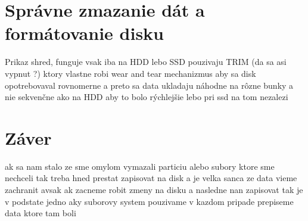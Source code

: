 \documentclass[12pt,oneside,slovak,a4paper]{article}
\begin{document}
\section{Správne zmazanie dát a formátovanie disku}
Prikaz shred, funguje vsak iba na HDD lebo SSD pouzivaju TRIM (da sa asi vypnut ?) ktory vlastne robi wear and tear mechanizmus aby sa disk opotrebovaval rovnomerne a preto sa data ukladaju náhodne na rôzne bunky a nie sekvenčne ako na HDD aby to bolo rýchlejšie lebo pri ssd na tom nezalezi

\section{Záver}
ak sa nam stalo ze sme omylom vymazali particiu alebo subory ktore sme nechceli tak treba hned prestat zapisovat na disk a je velka sanca ze data vieme zachranit avsak ak zacneme robit zmeny na disku a nasledne nan zapisovat tak je v podstate jedno aky suborovy system pouzivame v kazdom pripade prepiseme data ktore tam boli




\end{document}
